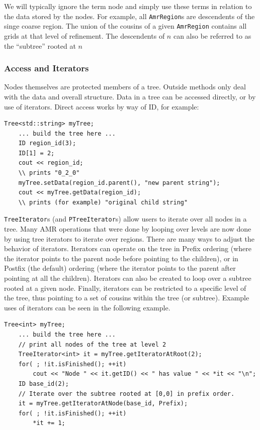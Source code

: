 \documentclass[11pt]{article}
\newcommand{\AR}{{\tt AmrRegion}}
\begin{document}
We will typically ignore the term node and simply use these terms in 
relation to the data stored by the nodes. For example, all \AR{}s 
are descendents of the singe coarse region. The union of the cousins 
of a given \AR{} contains all grids at that level of refinement. The 
descendents of $n$ can also be referred to as the ``subtree'' rooted 
at $n$

\subsubsection{Access and Iterators}
\label {iterators}

Nodes themselves are protected members of a tree. Outside methods 
only deal with the data and overall structure. Data in a tree can be 
accessed directly, or by use of iterators. Direct access works by 
way of ID, for example:
\begin{lstlisting}[backgroundcolor=\color{light-blue}]
    Tree<std::string> myTree;
    ... build the tree here ...
    ID region_id(3);
    ID[1] = 2;
    cout << region_id;
    \\ prints "0_2_0"
    myTree.setData(region_id.parent(), "new parent string");
    cout << myTree.getData(region_id);
    \\ prints (for example) "original child string"
\end{lstlisting}

{\tt TreeIterator}s (and {\tt PTreeIterator}s) allow users to iterate 
over all nodes in a tree. Many AMR operations that were done by 
looping over levels are now done by using tree iterators to iterate 
over regions. There are many ways to adjust the behavior of iterators. 
Iterators can operate on the tree in Prefix ordering (where the 
iterator points to the parent node before pointing to the children), 
or in Postfix (the default) ordering (where the iterator points to the parent after 
pointing at all the children). Iterators can also be created to loop 
over a subtree rooted at a given node. Finally, iterators can be 
restricted to a specific level of the tree, thus pointing to a set of 
cousins within the tree (or subtree). Example uses of iterators can 
be seen in the following example.
\begin{lstlisting}[backgroundcolor=\color{light-blue}]
    Tree<int> myTree;
    ... build the tree here ...
    // print all nodes of the tree at level 2
    TreeIterator<int> it = myTree.getIteratorAtRoot(2);
    for( ; !it.isFinished(); ++it)
        cout << "Node " << it.getID() << " has value " << *it << "\n";
    ID base_id(2);
    // Iterate over the subtree rooted at [0,0] in prefix order.
    it = myTree.getIteratorAtNode(base_id, Prefix);
    for( ; !it.isFinished(); ++it)
        *it += 1;
\end{lstlisting}
\end{document}
